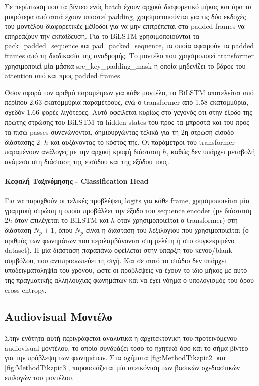 Σε περίπτωση που τα βίντεο ενός batch έχουν αρχικά διαφορετικό μήκος και άρα τα μικρότερα από αυτά έχουν υποστεί padding, χρησιμοποιούνται για τις δύο εκδοχές του μοντέλου διαφορετικές μέθοδοι για να μην επιτρέπεται στα padded frames να επηρεάζουν την εκπαίδευση. Για το BiLSTM χρησιμοποιούνται τα pack\_padded\_sequence και pad\_packed\_sequence, τα οποία αφαιρούν τα padded frames από τη διαδικασία της αναδρομής. Το μοντέλο που χρησιμοποιεί transformer χρησιμοποιεί μία μάσκα src\_key\_padding\_mask η οποία μηδενίζει το βάρος του attention από και προς padded frames. 

Όσον αφορά τον αριθμό παραμέτρων για κάθε μοντέλο, το BiLSTM αποτελείται από περίπου 2.63 εκατομμύρια παραμέτρους, ενώ ο transformer από 1.58 εκατομμύρια, σχεδόν 1.66 φορές λιγότερες. Αυτό οφείλεται κυρίως στο γεγονός ότι στην έξοδο της πρώτης στρώσης του BiLSTM τα hidden states του προς τα μπροστά και του προς τα πίσω passes συνενώνονται, δημιουργώντας τελικά για τη 2η στρώση είσοδο διάστασης $2\cdot h$ και αυξάνοντας το κόστος της. Οι παράμετροι του transformer παραμένουν ανάλογες με την αρχική κρυφή διάσταση $h$, καθώς δεν υπάρχει μεταβολή ανάμεσα στη διάσταση της εισόδου και της εξόδου τους.

\paragraph{Κεφαλή Ταξινόμησης - Classification Head}

Για να παραχθούν οι τελικές προβλέψεις logits για κάθε frame, χρησιμοποιείται μία γραμμική στρώση η οποία προβάλλει την έξοδο του sequence encoder (με διάσταση $2h$ όταν επιλέγεται το BiLSTM και $h$ όταν χρησιμοποιείται ο transformer) στη διάσταση $N_p+1$, όπου $N_p$ είναι η διάσταση του λεξιλογίου που χρησιμοποιείται (ο αριθμός των φωνημάτων που περιλαμβάνονται στη μελέτη ή στο συγκεκριμένο dataset). Η μία διάσταση παραπάνω οφείλεται στην ύπαρξη του κενού/blank συμβόλου, που αντιπροσωπεύει τη σιγή. Και σε αυτό το στάδιο δεν υπάρχει υποδειγματοληψία του χρόνου, ώστε οι προβλέψεις να έχουν το ίδιο μήκος με αυτό της πραγματικής αλληλουχίας φωνημάτων και να έχει νόημα ο υπολογισμός του όρου cross entropy. 

\subsection{Audiovisual Μοντέλο}
\label{AudiovisualModel}
Στην ενότητα αυτή περιγράφεται αναλυτικά η αρχιτεκτονική του προτεινόμενου audiovisual μοντέλου, το οποίο συνδυάζει τόσο το ηχητικό όσο και το σήμα βίντεο για την πρόβλεψη των φωνημάτων. Στα σχήματα \ref{fig:MethodTikzpic2} και \ref{fig:MethodTikzpic3}, παρουσιάζεται μία απεικόνιση των βασικών σχεδιαστικών επιλογών του μοντέλου.


